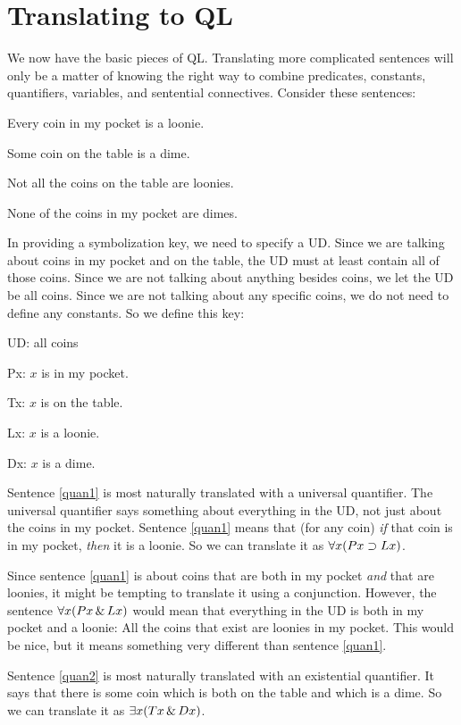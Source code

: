 \section{Translating to QL}
We now have the basic pieces of QL. Translating more complicated sentences will only be a matter of knowing the right way to combine predicates, constants, quantifiers, variables, and sentential connectives. Consider these sentences:
\begin{earg}
\item[\ex{quan1}] Every coin in my pocket is a loonie.
\item[\ex{quan2}] Some coin on the table is a dime.
\item[\ex{quan3}] Not all the coins on the table are loonies.
\item[\ex{quan4}] None of the coins in my pocket are dimes.
\end{earg}
In providing a symbolization key, we need to specify a UD. Since we are talking about coins in my pocket and on the table, the UD must at least contain all of those coins. Since we are not talking about anything besides coins, we let the UD be all coins. Since we are not talking about any specific coins, we do not need to define any constants. So we define this key:
\begin{ekey}
\item[UD:] all coins
\item[Px:] $x$ is in my pocket.
\item[Tx:] $x$ is on the table.
\item[Lx:] $x$ is a loonie.
\item[Dx:] $x$ is a dime.
\end{ekey}
Sentence \ref{quan1} is most naturally translated with a universal quantifier. The universal quantifier says something about everything in the UD, not just about the coins in my pocket. Sentence \ref{quan1} means that (for any coin) \emph{if} that coin is in my pocket, \emph{then} it is a loonie. So we can translate it as $\forall x(Px \supset Lx)$.

Since sentence \ref{quan1} is about coins that are both in my pocket \emph{and} that are loonies, it might be tempting to translate it using a conjunction. However, the sentence $\forall x(Px \,\&\, Lx)$ would mean that everything in the UD is both in my pocket and a loonie: All the coins that exist are loonies in my pocket. This would be nice, but it means something very different than sentence \ref{quan1}.

Sentence \ref{quan2} is most naturally translated with an existential quantifier. It says that there is some coin which is both on the table and which is a dime. So we can translate it as $\exists x(Tx \,\&\, Dx)$.

